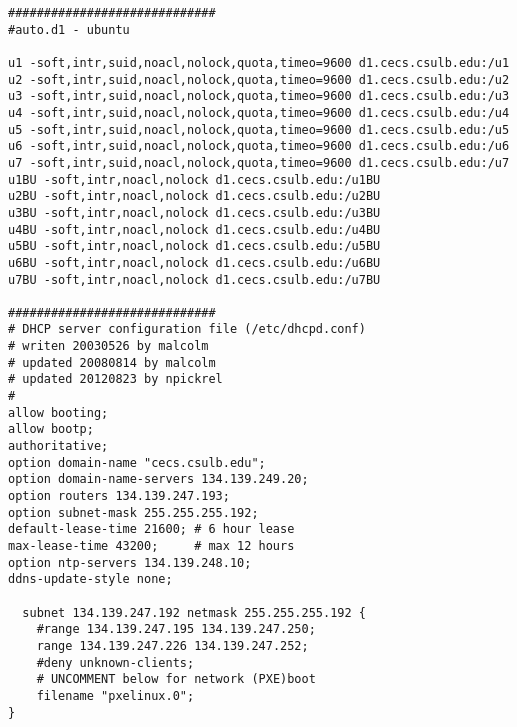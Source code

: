 \begin{verbatim}
#############################
#auto.d1 - ubuntu

u1 -soft,intr,suid,noacl,nolock,quota,timeo=9600 d1.cecs.csulb.edu:/u1
u2 -soft,intr,suid,noacl,nolock,quota,timeo=9600 d1.cecs.csulb.edu:/u2
u3 -soft,intr,suid,noacl,nolock,quota,timeo=9600 d1.cecs.csulb.edu:/u3
u4 -soft,intr,suid,noacl,nolock,quota,timeo=9600 d1.cecs.csulb.edu:/u4
u5 -soft,intr,suid,noacl,nolock,quota,timeo=9600 d1.cecs.csulb.edu:/u5
u6 -soft,intr,suid,noacl,nolock,quota,timeo=9600 d1.cecs.csulb.edu:/u6
u7 -soft,intr,suid,noacl,nolock,quota,timeo=9600 d1.cecs.csulb.edu:/u7
u1BU -soft,intr,noacl,nolock d1.cecs.csulb.edu:/u1BU
u2BU -soft,intr,noacl,nolock d1.cecs.csulb.edu:/u2BU
u3BU -soft,intr,noacl,nolock d1.cecs.csulb.edu:/u3BU
u4BU -soft,intr,noacl,nolock d1.cecs.csulb.edu:/u4BU
u5BU -soft,intr,noacl,nolock d1.cecs.csulb.edu:/u5BU
u6BU -soft,intr,noacl,nolock d1.cecs.csulb.edu:/u6BU
u7BU -soft,intr,noacl,nolock d1.cecs.csulb.edu:/u7BU

#############################
# DHCP server configuration file (/etc/dhcpd.conf)
# writen 20030526 by malcolm
# updated 20080814 by malcolm
# updated 20120823 by npickrel
# 	
allow booting;
allow bootp;
authoritative;
option domain-name "cecs.csulb.edu";
option domain-name-servers 134.139.249.20;
option routers 134.139.247.193;
option subnet-mask 255.255.255.192;
default-lease-time 21600; # 6 hour lease
max-lease-time 43200;     # max 12 hours
option ntp-servers 134.139.248.10;
ddns-update-style none;

  subnet 134.139.247.192 netmask 255.255.255.192 {
    #range 134.139.247.195 134.139.247.250;
    range 134.139.247.226 134.139.247.252;
    #deny unknown-clients;
    # UNCOMMENT below for network (PXE)boot
    filename "pxelinux.0";
}

\end{verbatim}
